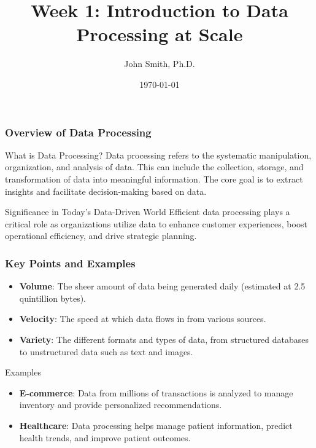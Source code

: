 \documentclass[aspectratio=169]{beamer}
\title[Introduction to Data Processing at Scale]{Week 1: Introduction to Data Processing at Scale}
\author[J. Smith]{John Smith, Ph.D.}
\institute[University Name]{
  Department of Computer Science\\
  University Name\\
  \vspace{0.3cm}
  Email: email@university.edu\\
  Website: www.university.edu
}
\date{\today}
\begin{document}
\frame{\titlepage}

\begin{frame}[fragile]
    \titlepage
\end{frame}

\begin{frame}[fragile]
    \frametitle{Overview of Data Processing}
    
    \begin{block}{What is Data Processing?}
        Data processing refers to the systematic manipulation, organization, and analysis of data. This can include the collection, storage, and transformation of data into meaningful information. The core goal is to extract insights and facilitate decision-making based on data.
    \end{block}
    
    \begin{block}{Significance in Today’s Data-Driven World}
        Efficient data processing plays a critical role as organizations utilize data to enhance customer experiences, boost operational efficiency, and drive strategic planning.
    \end{block}
\end{frame}

\begin{frame}[fragile]
    \frametitle{Key Points and Examples}
    
    \begin{itemize}
        \item \textbf{Volume}: The sheer amount of data being generated daily (estimated at 2.5 quintillion bytes).
        \item \textbf{Velocity}: The speed at which data flows in from various sources.
        \item \textbf{Variety}: The different formats and types of data, from structured databases to unstructured data such as text and images.
    \end{itemize}
    
    \begin{block}{Examples}
        \begin{itemize}
            \item \textbf{E-commerce}: Data from millions of transactions is analyzed to manage inventory and provide personalized recommendations.
            \item \textbf{Healthcare}: Data processing helps manage patient information, predict health trends, and improve patient outcomes.
        \end{itemize}
    \end{block}
\end{frame}
\end{document}
